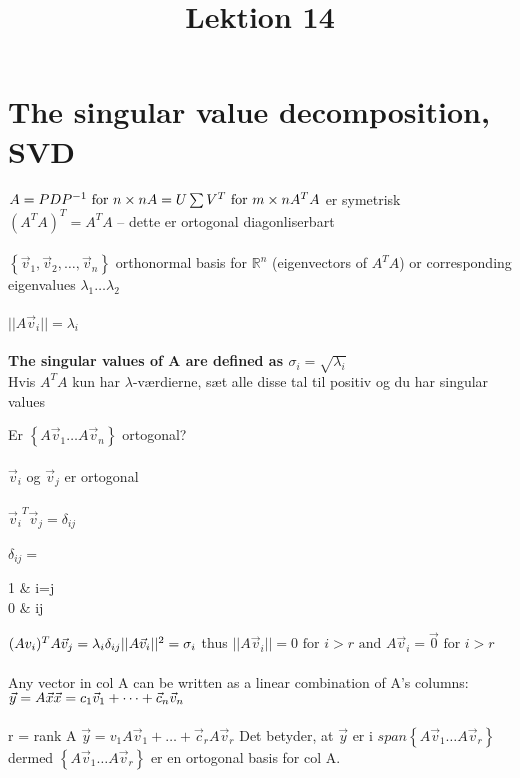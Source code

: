 \documentclass[danish, english]{article}
\title{Lektion 14}
\begin{document}
\maketitle


\section*{The singular value decomposition, SVD}
\begin{theo} 
$A=PDP^{-1} \text{ for } n \times n\\
A=U\sum V^T \text{ for } m \times n\\
A^TA$ er symetrisk\\
$(A^TA)^T = A^TA$ -- dette er ortogonal diagonliserbart
\\
\\
$\left\{ \vec{v}_1, \vec{v}_2, \dots , \vec{v}_n\right\}$ orthonormal basis for $\mathbb{R}^n$ (eigenvectors of $A^TA$) or corresponding eigenvalues $\lambda_1 \dots \lambda_2$
\\
\\
$||A\vec{v}_i||=\lambda_i$
\\
\\
\textbf{The singular values of A are defined as $\sigma_i=\sqrt{\lambda_i}$}\\
Hvis $A^TA$ kun har $\lambda$-værdierne, sæt alle disse tal til positiv og du har singular values
\end{theo}

\begin{theo} 
Er $\left\{A\vec{v}_1\dots A\vec{v}_n\right\}$ ortogonal?\\
\\
$\vec{v}_i$ og $\vec{v}_j$ er ortogonal\\
\\
${\vec{v}_i}^T\vec{v}_j = \delta_{ij}$
\\
\\
$\delta_{ij}=$
\begin{solu}
1 & i=j\\
0 & i\neq j
\end{solu}

$(Av_i)^TA\vec{v}_j = \lambda_i\delta_{ij}\\
||A\vec{v}_i||^2 = \sigma_i$ thus $||A\vec{v}_i||=0 \text{ for } i > r \text{ and }A\vec{v}_i=\vec{0} \text{ for } i>r$
\\
\\
Any vector in col A can be written as a linear combination of A's columns:
\\
$\vec{y}=A\vec{x}\\
 \vec{x} = c_1\vec{v}_1 +\dots+\vec{c}_n\vec{v}_n$
 \\
 \\
r = rank A
$\vec{y}=v_1A\vec{v}_1 + \dots + \vec{c}_rA\vec{v}_r$
Det betyder, at $\vec{y}$ er i $span\left\{A\vec{v}_1 \dots A\vec{v}_r\right\}$ dermed $\left\{A\vec{v}_1 \dots A\vec{v}_r\right\}$ er en ortogonal basis for col A.
\end{theo}
\end{document}
